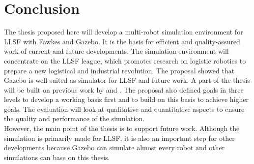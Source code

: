 \documentclass[11pt,a4paper]{article}
\begin{document}
\section{Conclusion}
The thesis proposed here will develop a multi-robot simulation environment for LLSF with Fawkes and Gazebo. It is the basis for efficient and quality-assured work of current and future developments. The simulation environment will concentrate on the LLSF league, which promotes research on logistic robotics to prepare a new logistical and industrial revolution. The proposal showed that Gazebo is well suited as simulator for LLSF and future work. A part of the thesis will be built on previous work by \cite{KlingenDA} and \cite{MultiLevelAbstraction}. The proposal also defined goals in three levels to develop a working basis first and to build on this basis to achieve higher goals. The evaluation will look at qualitative and quantitative aspects to ensure the quality and performance of the simulation.\\
However, the main point of the thesis is to support future work. Although the simulation is primarily made for LLSF, it is also an important step for other developments because Gazebo can simulate almost every robot and other simulations can base on this thesis.




\end{document}
